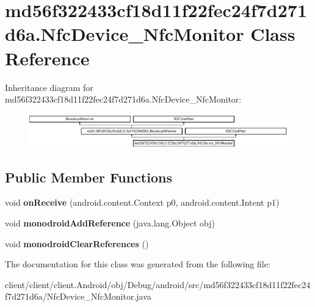 \hypertarget{classmd56f322433cf18d11f22fec24f7d271d6a_1_1NfcDevice__NfcMonitor}{}\section{md56f322433cf18d11f22fec24f7d271d6a.\+Nfc\+Device\+\_\+\+Nfc\+Monitor Class Reference}
\label{classmd56f322433cf18d11f22fec24f7d271d6a_1_1NfcDevice__NfcMonitor}
Inheritance diagram for md56f322433cf18d11f22fec24f7d271d6a.\+Nfc\+Device\+\_\+\+Nfc\+Monitor\+:\begin{figure}[H]
\begin{center}
\leavevmode
\includegraphics[height=1.450777cm]{classmd56f322433cf18d11f22fec24f7d271d6a_1_1NfcDevice__NfcMonitor}
\end{center}
\end{figure}
\subsection*{Public Member Functions}
\begin{DoxyCompactItemize}
\item 
\hypertarget{classmd56f322433cf18d11f22fec24f7d271d6a_1_1NfcDevice__NfcMonitor_a701337bab56588f66f2a5b43d20a2bae}{}void {\bfseries on\+Receive} (android.\+content.\+Context p0, android.\+content.\+Intent p1)\label{classmd56f322433cf18d11f22fec24f7d271d6a_1_1NfcDevice__NfcMonitor_a701337bab56588f66f2a5b43d20a2bae}

\item 
\hypertarget{classmd56f322433cf18d11f22fec24f7d271d6a_1_1NfcDevice__NfcMonitor_a9f7ba1374872120e55f9226cf9323fc7}{}void {\bfseries monodroid\+Add\+Reference} (java.\+lang.\+Object obj)\label{classmd56f322433cf18d11f22fec24f7d271d6a_1_1NfcDevice__NfcMonitor_a9f7ba1374872120e55f9226cf9323fc7}

\item 
\hypertarget{classmd56f322433cf18d11f22fec24f7d271d6a_1_1NfcDevice__NfcMonitor_add4cab2a9a76e093711db7df0ca08db1}{}void {\bfseries monodroid\+Clear\+References} ()\label{classmd56f322433cf18d11f22fec24f7d271d6a_1_1NfcDevice__NfcMonitor_add4cab2a9a76e093711db7df0ca08db1}

\end{DoxyCompactItemize}


The documentation for this class was generated from the following file\+:\begin{DoxyCompactItemize}
\item 
client/client/client.\+Android/obj/\+Debug/android/src/md56f322433cf18d11f22fec24f7d271d6a/Nfc\+Device\+\_\+\+Nfc\+Monitor.\+java\end{DoxyCompactItemize}
